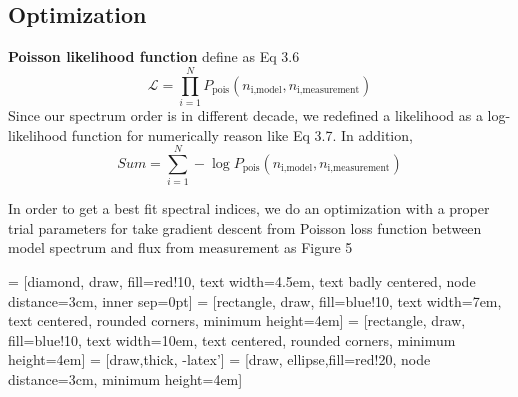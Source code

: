 
\subsection{Optimization}

\par \textbf{Poisson likelihood function} define as Eq 3.6
\begin{equation}
    \mathcal{L} = \prod_{i=1}^{N} P_{\text{pois}}(n_{\text{i,model}}, n_{\text{i,measurement}})
\end{equation}
Since our spectrum order is in different decade, we redefined a likelihood as a log-likelihood function for numerically reason like Eq 3.7. In addition, 
\begin{equation}
    Sum = \sum_{i=1}^{N} -\log P_{\text{pois}}(n_{\text{i,model}}, n_{\text{i,measurement}})
\end{equation}


\par In order to get a best fit spectral indices, we do an optimization with a proper trial parameters for take gradient descent from Poisson loss function between model spectrum and flux from measurement as Figure 5


 = [diamond, draw, fill=red!10, 
    text width=4.5em, text badly centered, node distance=3cm, inner sep=0pt]
 = [rectangle, draw, fill=blue!10, 
    text width=7em, text centered, rounded corners, minimum height=4em]
 = [rectangle, draw, fill=blue!10, 
    text width=10em, text centered, rounded corners, minimum height=4em]
 = [draw,thick, -latex']
 = [draw, ellipse,fill=red!20, node distance=3cm,
    minimum height=4em]

